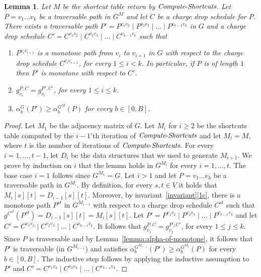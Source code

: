 \documentclass[11pt]{article}
\newtheorem{lemma}[theorem]{Lemma}
\newcommand{\ComputeS}{\mbox{{\it Compute}-{\it Shortcuts}}}
\begin{document}
\begin{lemma}\label{lem:GM_to_G}
    Let $M$ be the shortcut table return by $\ComputeS$. Let $P= v_1\ldots v_k$ be a traversable path in $G^M$ and let $C$ be a charge drop schedule for $P$. There exists a traversable path $P' = P^{v_1 v_2} \mid P^{v_2 v_3}\mid \ldots \mid P^{v_{k-1}v_k}$ in $G$ and a charge drop schedule $C' = C^{v_1 v_2} \mid C^{v_2 v_3}\mid \ldots \mid C^{v_{k-1}v_k}$ such that

    \begin{enumerate}[label=(\alph*)]
        \item $P^{v_i v_{i+1}}$ is a monotone path from $v_i$ to $v_{i+1}$ in $G$ with respect to the charge drop schedule  $C^{v_i v_{i+1}}$, for every $1\le i<k$. In particular, if $P$ is of length $1$ then $P'$ is monotone with respect to $C'$.
        \item $g^{P,C}_{v_i} = g^{P',C'}_{v_i}$, for every $1\le i\le k$.
        \item  $\alpha^{G}_b(P') \ge \alpha^{G^M}_b(P)$ for every $b\in [0,B]$.
    \end{enumerate}
\end{lemma}

\begin{proof}
    Let $M_1$ be the adjacency matrix of $G$. Let $M_i$ for $i\ge 2$ be the shortcuts table computed by the $i-1$'th iteration of $\ComputeS$ and let $M_t = M$, where $t$ is the number of iterations of $\ComputeS$. For every $i=1,\ldots,t-1$, let  $D_i$ be the data structures that we used to generate $M_{i+1}$. We prove by induction on $i$ that the lemma holds in $G^{M_i}$ for every $i=1,\ldots ,t$. The base case $i=1$ follows since $G^{M_1} = G$. Let $i>1$ and let $P= v_1\ldots v_k$ be a traversable path in $G^{M_i}$. By definition, for every $s,t\in V$ it holds that $M_i[s][t] = D_{i-1}[s][t]$. Moreover, by invariant~\ref{invariant}\ref{1c}, there is a monotone path $P^{st}$ in $G^{M_{i-1}}$ with respect to a charge drop schedule $C^{st}$ such that $g^{C^{st}}(P^{st}) = D_{i-1}[s][t] =  M_i[s][t]$. Let $P' = P^{v_1 v_2} \mid P^{v_2 v_3}\mid \ldots \mid P^{v_{k-1}v_k}$ and let $C' = C^{v_1 v_2} \mid C^{v_2 v_3}\mid \ldots \mid C^{v_{k-1}v_k}$. It follows that $g^{P,C}_{v_j} = g^{P',C'}_{v_j}$, for every $1\le j\le k$.
    Since $P$ is traversable and by Lemma~\ref{lemma:alpha-of-monotone}, it follows that $P'$ is traversable (in $G^{M_{i-1}}$) and satisfies $\alpha^{G^{M_{i-1}}}_b(P') \ge \alpha^{G^{M_i}}_b(P)$ for every $b\in [0,B]$. The inductive step follows by applying the inductive assumption to $P'$ and $C' = C^{v_1 v_2} \mid C^{v_2 v_3}\mid \ldots \mid C^{v_{k-1}v_k}$.
    \end{proof}
\end{document}
